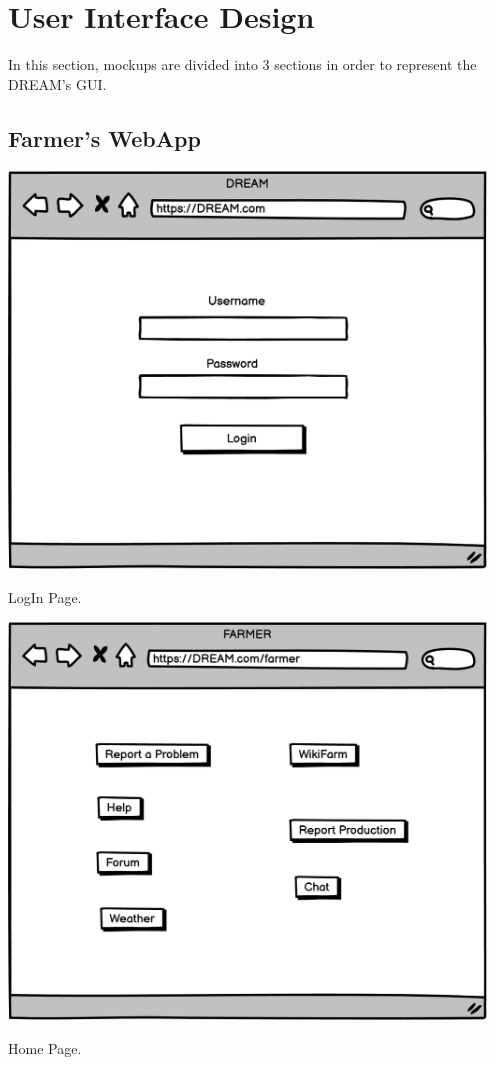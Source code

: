 \section{User Interface Design}
In this section, mockups are divided into 3 sections in order to represent the DREAM's GUI.
\subsection{Farmer's WebApp}
\vspace{1cm}
\begin{minipage}{.5\textwidth}
	\centering
	\includegraphics[width=0.95\textwidth]{Images/Mockup/Farmer/01LoginPage.png}
	\captionsetup{type=figure}
	\caption{LogIn Page.}
\end{minipage}%
\begin{minipage}{.5\textwidth}
	\centering
	\includegraphics[width=0.95\textwidth]{Images/Mockup/Farmer/02FarmerHomepage.png}
	\captionsetup{type=figure}
	\caption{Home Page.}
\end{minipage}
